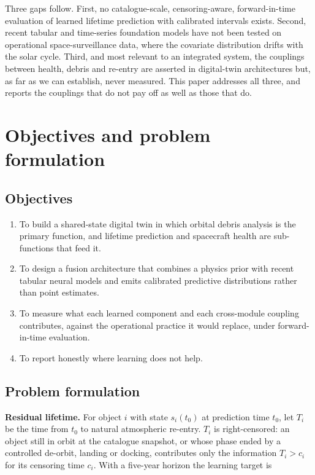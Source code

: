 \documentclass[3p,times,twocolumn]{elsarticle}
\providecommand{\tightlist}{\setlength{\itemsep}{0pt}\setlength{\parskip}{0pt}}
\providecommand{\tightlist}{\setlength{\itemsep}{0pt}\setlength{\parskip}{0pt}}
\begin{document}
Three gaps follow. First, no catalogue-scale, censoring-aware,
forward-in-time evaluation of learned lifetime prediction with
calibrated intervals exists. Second, recent tabular and time-series
foundation models have not been tested on operational space-surveillance
data, where the covariate distribution drifts with the solar cycle.
Third, and most relevant to an integrated system, the couplings between
health, debris and re-entry are asserted in digital-twin architectures
but, as far as we can establish, never measured. This paper addresses
all three, and reports the couplings that do not pay off as well as
those that do.

\section{Objectives and problem formulation}\label{sec:objectives}

\subsection{Objectives}\label{objectives}

\begin{enumerate}
\def\labelenumi{\arabic{enumi}.}
\tightlist
\item
  To build a shared-state digital twin in which orbital debris analysis
  is the primary function, and lifetime prediction and spacecraft health
  are sub-functions that feed it.
\item
  To design a fusion architecture that combines a physics prior with
  recent tabular neural models and emits calibrated predictive
  distributions rather than point estimates.
\item
  To measure what each learned component and each cross-module coupling
  contributes, against the operational practice it would replace, under
  forward-in-time evaluation.
\item
  To report honestly where learning does not help.
\end{enumerate}

\subsection{Problem formulation}\label{problem-formulation}

\textbf{Residual lifetime.} For object \(i\) with state \(s_i(t_0)\) at
prediction time \(t_0\), let \(T_i\) be the time from \(t_0\) to natural
atmospheric re-entry. \(T_i\) is right-censored: an object still in
orbit at the catalogue snapshot, or whose phase ended by a controlled
de-orbit, landing or docking, contributes only the information
\(T_i > c_i\) for its censoring time \(c_i\). With a five-year horizon
the learning target is
\end{document}
